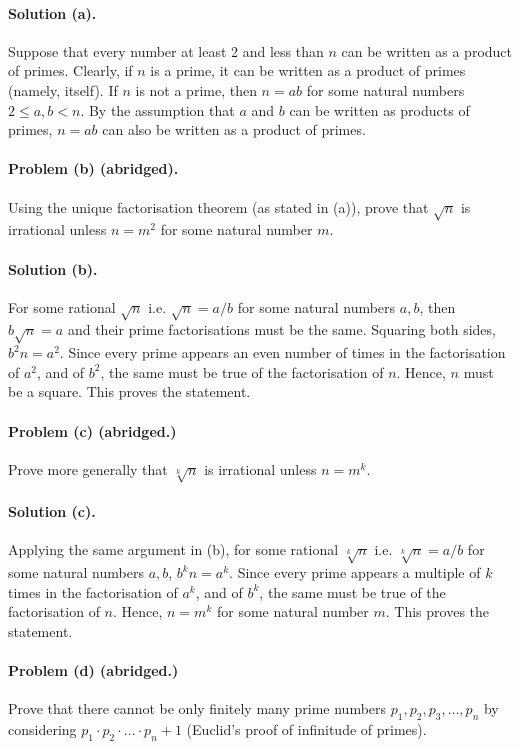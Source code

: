\documentclass{article}
\begin{document}
\paragraph{Solution (a).} Suppose that every number at least 2 and less than
$n$ can be written as a product of primes. Clearly, if $n$ is a prime, it can
be written as a product of primes (namely, itself). If $n$ is not a prime, then
$n = ab$ for some natural numbers $2 \leq a, b < n$. By the assumption that $a$
and $b$ can be written as products of primes, $n = ab$ can also be written as a
product of primes.

\paragraph{Problem (b) (abridged).} Using the unique factorisation theorem (as
stated in (a)), prove that $\sqrt{n}$ is irrational unless $n = m^2$ for some
natural number $m$.

\paragraph{Solution (b).} For some rational $\sqrt{n}$ i.e. $\sqrt{n} = a/b$
for some natural numbers $a, b$, then $b\sqrt{n} = a$ and their prime
factorisations must be the same. Squaring both sides, $b^2n = a^2$. Since every
prime appears an even number of times in the factorisation of $a^2$, and of
$b^2$, the same must be true of the factorisation of $n$. Hence, $n$ must be a
square. This proves the statement.

\paragraph{Problem (c) (abridged.)} Prove more generally that $\sqrt[k]{n}$ is
irrational unless $n = m^k$.

\paragraph{Solution (c).} Applying the same argument in (b), for some rational
$\sqrt[k]{n}$ i.e. $\sqrt[k]{n} = a/b$ for some natural numbers $a, b$, $b^kn =
a^k$. Since every prime appears a multiple of $k$ times in the factorisation of
$a^k$, and of $b^k$, the same must be true of the factorisation of $n$. Hence,
$n = m^k$ for some natural number $m$. This proves the statement.

\paragraph{Problem (d) (abridged.)} Prove that there cannot be only finitely
many prime numbers $p_1, p_2, p_3, \ldots, p_n$ by considering $p_1 \cdot p_2
\cdot \ldots \cdot p_n + 1$ (Euclid's proof of infinitude of primes).
\end{document}
